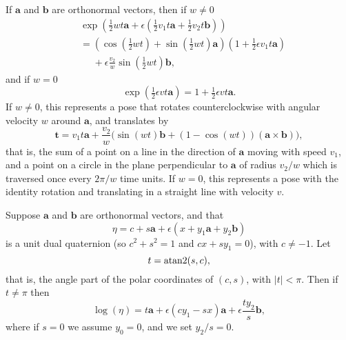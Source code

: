 \documentclass[reqno,12pt]{amsart}
\newtheorem{theorem}{Theorem}
\begin{document}
If $\bm a$ and $\bm b$ are orthonormal vectors, then if $w \ne 0$
\label{exp theta}
\begin{equation}
\begin{aligned}
& \exp\left(\tfrac12wt \bm a + \epsilon(\tfrac12v_1t \bm a + \tfrac12v_2t \bm b)\right) \\
&= \left(\cos(\tfrac12wt) + \sin(\tfrac12wt) \bm a\right) \left(1 + \tfrac12 \epsilon v_1t \bm a \right) \\
&\phantom{{}={}} + \epsilon \frac{v_2}w\sin(\tfrac12 wt) \bm b ,
\end{aligned}
\end{equation}
and if $w = 0$
\begin{equation}
\exp\left(\tfrac12 \epsilon vt \bm a\right) = 1 + \tfrac12 \epsilon v t \bm a .
\end{equation}
If $w \ne 0$, this represents a pose that rotates counterclockwise with angular velocity $w$ around $\bm a$, and translates by
\begin{equation}
\bm t = v_1 t \bm a + \frac {v_2}w\bigl(\sin(wt)  \bm b + (1-\cos(wt)) (\bm a \times \bm b) \bigr) ,
\end{equation}
that is, the sum of a point on a line in the direction of $\bm a$ moving with speed $v_1$, and a point on a circle in the plane perpendicular to $\bm a$ of radius $v_2/w$ which is traversed once every $2\pi/w$ time units.  If $w = 0$, this represents a pose with the identity rotation and translating in a straight line with velocity $v$.

Suppose $\bm a$ and $\bm b$ are orthonormal vectors, and that
\begin{equation}
\label{eta for log}
\eta = c + s \bm a + \epsilon (x + y_1 \bm a + y_2 \bm b)
\end{equation}
is a unit dual quaternion (so $c^2 + s^2 = 1$ and $cx + sy_1 = 0$), with $c \ne -1$.  Let
\begin{equation}
t = \text{\rm atan2}(s,c),
\end{equation}
that is, the angle part of the polar coordinates of $(c,s)$, with $|t| < \pi$.  Then if $t \ne \pi$ then
\begin{equation}
\log(\eta) = t \bm a + \epsilon (c y_1 - s x ) \bm a
+ \epsilon \frac{t y_2}{s} \bm b,
\end{equation}
where if $s = 0$ we assume $y_0 = 0$, and we set $y_2/s = 0$.
\end{document}
